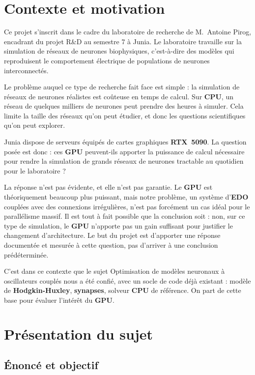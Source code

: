 \documentclass{report}
\begin{document}
\chapter{Contexte et motivation}

Ce projet s'inscrit dans le cadre du laboratoire de recherche de M.~Antoine Pirog, encadrant du projet R\&D au semestre 7 à Junia. Le laboratoire travaille sur la simulation de réseaux de neurones biophysiques, c'est-à-dire des modèles qui reproduisent le comportement électrique de populations de neurones interconnectés.

Le problème auquel ce type de recherche fait face est simple : la simulation de réseaux de neurones réalistes est coûteuse en temps de calcul. Sur \textbf{CPU}, un réseau de quelques milliers de neurones peut prendre des heures à simuler. Cela limite la taille des réseaux qu'on peut étudier, et donc les questions scientifiques qu'on peut explorer.

Junia dispose de serveurs équipés de cartes graphiques \textbf{RTX~5090}. La question posée est donc : ces \textbf{GPU} peuvent-ils apporter la puissance de calcul nécessaire pour rendre la simulation de grands réseaux de neurones tractable au quotidien pour le laboratoire ?

La réponse n'est pas évidente, et elle n'est pas garantie. Le \textbf{GPU} est théoriquement beaucoup plus puissant, mais notre problème, un système d'\textbf{EDO} couplées avec des connexions irrégulières, n'est pas forcément un cas idéal pour le parallélisme massif. Il est tout à fait possible que la conclusion soit : non, sur ce type de simulation, le \textbf{GPU} n'apporte pas un gain suffisant pour justifier le changement d'architecture. Le but du projet est d'apporter une réponse documentée et mesurée à cette question, pas d'arriver à une conclusion prédéterminée.

C'est dans ce contexte que le sujet \og Optimisation de modèles neuronaux à oscillateurs couplés \fg{} nous a été confié, avec un socle de code déjà existant : modèle de \textbf{Hodgkin-Huxley}, \textbf{synapses}, solveur \textbf{CPU} de référence. On part de cette base pour évaluer l'intérêt du \textbf{GPU}.

\chapter{Présentation du sujet}

\section{Énoncé et objectif}
\end{document}
